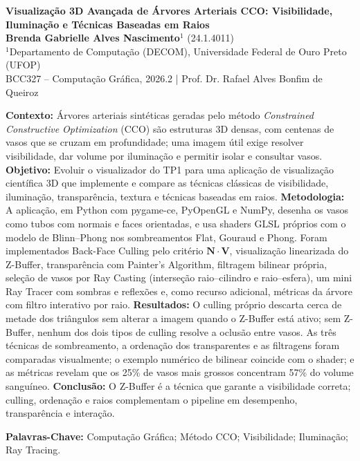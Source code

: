 \documentclass[11pt, a4paper]{article}
\newcommand{\vetor}[1]{\mathbf{#1}}
\begin{document}
\begin{center}
  {\LARGE \bfseries \textcolor{ufopred}{Visualização 3D Avançada de Árvores Arteriais CCO: Visibilidade, Iluminação e Técnicas Baseadas em Raios}}\\[0.4cm]
  {\large \textbf{Brenda Gabrielle Alves Nascimento}$^{1}$ (24.1.4011)}\\[0.2cm]
  {\small $^{1}$Departamento de Computação (DECOM), Universidade Federal de Ouro Preto (UFOP)\\[0.1cm]
  BCC327 -- Computação Gráfica, 2026.2 | Prof. Dr. Rafael Alves Bonfim de Queiroz}\\[0.4cm]
\end{center}

\begin{tcolorbox}[colback=lightgray, colframe=deepnavy, arc=3pt, title=\textbf{RESUMO}, fonttitle=\bfseries]
\small
\textbf{Contexto:} Árvores arteriais sintéticas geradas pelo método \emph{Constrained Constructive Optimization} (CCO) são estruturas 3D densas, com centenas de vasos que se cruzam em profundidade; uma imagem útil exige resolver visibilidade, dar volume por iluminação e permitir isolar e consultar vasos.
\textbf{Objetivo:} Evoluir o visualizador do TP1 para uma aplicação de visualização científica 3D que implemente e compare as técnicas clássicas de visibilidade, iluminação, transparência, textura e técnicas baseadas em raios.
\textbf{Metodologia:} A aplicação, em Python com pygame-ce, PyOpenGL e NumPy, desenha os vasos como tubos com normais e faces orientadas, e usa shaders GLSL próprios com o modelo de Blinn--Phong nos sombreamentos Flat, Gouraud e Phong. Foram implementados Back-Face Culling pelo critério $\vetor{N} \cdot \vetor{V}$, visualização linearizada do Z-Buffer, transparência com Painter's Algorithm, filtragem bilinear própria, seleção de vasos por Ray Casting (interseção raio--cilindro e raio--esfera), um mini Ray Tracer com sombras e reflexões e, como recurso adicional, métricas da árvore com filtro interativo por raio.
\textbf{Resultados:} O culling próprio descarta cerca de metade dos triângulos sem alterar a imagem quando o Z-Buffer está ativo; sem Z-Buffer, nenhum dos dois tipos de culling resolve a oclusão entre vasos. As três técnicas de sombreamento, a ordenação dos transparentes e as filtragens foram comparadas visualmente; o exemplo numérico de bilinear coincide com o shader; e as métricas revelam que os 25\% de vasos mais grossos concentram 57\% do volume sanguíneo.
\textbf{Conclusão:} O Z-Buffer é a técnica que garante a visibilidade correta; culling, ordenação e raios complementam o pipeline em desempenho, transparência e interação.

\vspace{0.2cm}
\textbf{Palavras-Chave:} Computação Gráfica; Método CCO; Visibilidade; Iluminação; Ray Tracing.
\end{tcolorbox}
\end{document}
